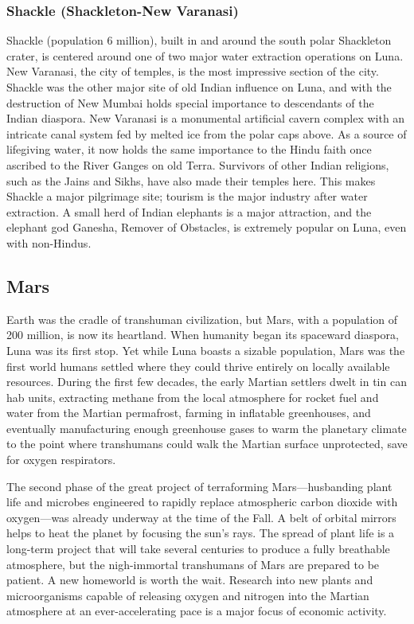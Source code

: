 \subsubsection{Shackle (Shackleton-New Varanasi)}

Shackle (population 6 million), built in and around 
the south polar Shackleton crater, is centered around 
one of two major water extraction operations on 
Luna. New Varanasi, the city of temples, is the most 
impressive section of the city. Shackle was the other 
major site of old Indian influence on Luna, and with 
the destruction of New Mumbai holds special importance to descendants of the Indian diaspora. New 
Varanasi is a monumental artificial cavern complex 
with an intricate canal system fed by melted ice from 
the polar caps above. As a source of lifegiving water, 
it now holds the same importance to the Hindu faith 
once ascribed to the River Ganges on old Terra. Survivors of other Indian religions, such as the Jains and 
Sikhs, have also made their temples here. This makes 
Shackle a major pilgrimage site; tourism is the major 
industry after water extraction. A small herd of Indian 
elephants is a major attraction, and the elephant god 
Ganesha, Remover of Obstacles, is extremely popular 
on Luna, even with non-Hindus.

\subsection{Mars}

Earth was the cradle of transhuman civilization, 
but Mars, with a population of 200 million, is now 
its heartland. When humanity began its spaceward 
diaspora, Luna was its first stop. Yet while Luna 
boasts a sizable population, Mars was the first world 
humans settled where they could thrive entirely 
on locally available resources. During the first few 
decades, the early Martian settlers dwelt in tin can 
hab units, extracting methane from the local atmosphere for rocket fuel and water from the Martian 
permafrost, farming in inflatable greenhouses, and 
eventually manufacturing enough greenhouse gases 
to warm the planetary climate to the point where 
transhumans could walk the Martian surface unprotected, save for oxygen respirators.

The second phase of the great project of terraforming Mars—husbanding plant life and microbes engineered to rapidly replace atmospheric carbon dioxide 
with oxygen—was already underway at the time of 
the Fall. A belt of orbital mirrors helps to heat the 
planet by focusing the sun's rays. The spread of plant 
life is a long-term project that will take several centuries to produce a fully breathable atmosphere, but 
the nigh-immortal transhumans of Mars are prepared 
to be patient. A new homeworld is worth the wait. 
Research into new plants and microorganisms capable 
of releasing oxygen and nitrogen into the Martian atmosphere at an ever-accelerating pace is a major focus 
of economic activity.

